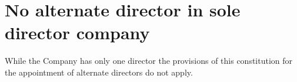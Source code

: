 \section{No alternate director in sole director company}

While the Company has only one director the provisions of this constitution for the appointment of alternate directors do not apply. 